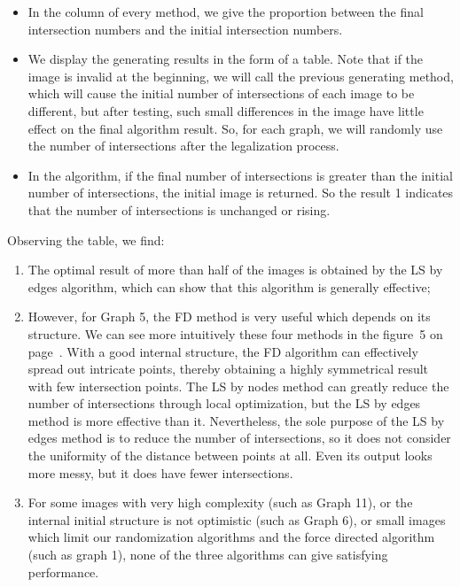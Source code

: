 \begin{itemize}
    \item In the column of every method, we give the proportion between the final intersection numbers and the initial intersection numbers.
    \item We display the generating results in the form of a table. Note that if the image is invalid at the beginning, we will call the previous generating method, which will cause the initial number of intersections of each image to be different, but after testing, such small differences in the image have little effect on the final algorithm result. So, for each graph, we will randomly use the number of intersections after the legalization process. 
    \item In the algorithm, if the final number of intersections is greater than the initial number of intersections, the initial image is returned. So the result 1 indicates that the number of intersections is unchanged or rising.
\end{itemize}
Observing the table, we find:
\begin{enumerate}
    \item The optimal result of more than half of the images is obtained by the LS by edges algorithm, which can show that this algorithm is generally effective;
    \item However, for Graph 5, the FD method is very useful which depends on its structure. We can see more intuitively these four methods in the figure~{5} on page~\pageref{fig:g5}. With a good internal structure, the FD algorithm can effectively spread out intricate points, thereby obtaining a highly symmetrical result with few intersection points. The LS by nodes method can greatly reduce the number of intersections through local optimization, but the LS by edges method is more effective than it. Nevertheless, the sole purpose of the LS by edges method is to reduce the number of intersections, so it does not consider the uniformity of the distance between points at all. Even its output looks more messy, but it does have fewer intersections.
    \item For some images with very high complexity (such as Graph 11), or the internal initial structure is not optimistic (such as Graph 6), or small images which limit our randomization algorithms and the force directed algorithm (such as graph 1), none of the three algorithms can give satisfying performance.
\end{enumerate}

